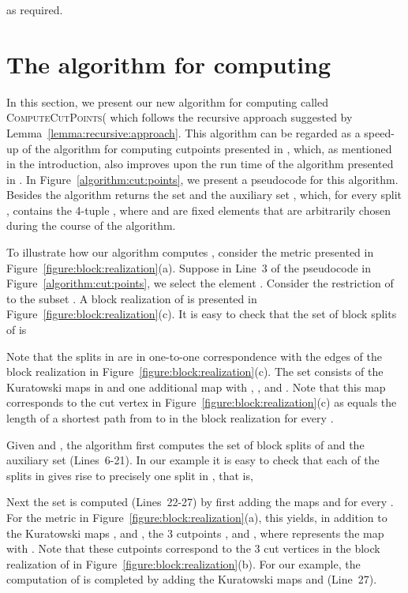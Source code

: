 \documentclass[12pt]{article}
\begin{document}
as required.
\hfill


\section{The algorithm for computing }
\label{section:algorith:computing:cut:d}


In this section, we present our new algorithm for computing   
called \textsc{ComputeCutPoints}( which follows the recursive
approach suggested by Lemma~\ref{lemma:recursive:approach}.
This algorithm can be regarded as a speed-up of the algorithm for computing
cutpoints presented in \cite{dress:virtual:cutpoints:2007}, 
which, as mentioned in the introduction, also improves upon the
run time of the algorithm presented in \cite{hertz:varone:cutpoint:partition}.
In Figure~\ref{algorithm:cut:points}, we present a pseudocode
for this algorithm. Besides  the algorithm returns
the set  and the auxiliary set ,
which, for every split , contains
the 4-tuple , where
 and  are fixed elements that are
arbitrarily chosen during the course of the algorithm.

To illustrate how our algorithm 
computes , consider the metric  presented in
Figure~\ref{figure:block:realization}(a). Suppose in Line~3
of the pseudocode in Figure~\ref{algorithm:cut:points}, 
we select the element . Consider
the restriction  of  to the subset .
A block realization of  is presented in 
Figure~\ref{figure:block:realization}(c). It is easy to check
that the set of block splits of  is

Note that the splits in  are in one-to-one correspondence
with the edges of the block realization in Figure~\ref{figure:block:realization}(c).
The set  consists of the Kuratowski maps in  and
one additional map  with
, ,  and .
Note that this map corresponds to the cut vertex 
in Figure~\ref{figure:block:realization}(c) as 
equals the length of a shortest path from  to
 in the block realization for every .

Given  and , the algorithm first computes
the set  of block splits of  and
the auxiliary set  (Lines~6-21).
In our example it is easy to check that each of the splits
in  gives rise to precisely one split in 
, that is,

Next the set  is computed (Lines~22-27) by first
adding the maps  and  for every .
For the metric  in Figure~\ref{figure:block:realization}(a), this
yields, in addition to the Kuratowski maps ,  and ,
the 3 cutpoints
,  and ,
where  represents the
map  with .
Note that these cutpoints correspond to the 3 cut vertices in the block realization
of  in Figure~\ref{figure:block:realization}(b).
For our example, the computation of  is completed
by adding the Kuratowski maps  and  (Line~27).
\end{document}
